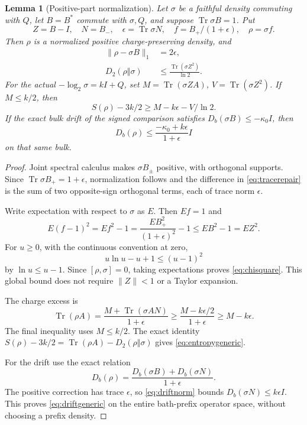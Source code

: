 \documentclass[11pt]{article}
\newtheorem{lemma}[theorem]{Lemma}
\newcommand{\Tr}{\operatorname{Tr}}
\newcommand{\norm}[1]{\lVert #1\rVert}
\begin{document}
\begin{lemma}[Positive-part normalization]\label{lem:repair}
Let \(\sigma\) be a faithful density commuting with \(Q\), let \(B=B^*\) commute with \(\sigma,Q\),
and suppose \(\Tr\sigma B=1\). Put
\[
 Z=B-I,\quad N=B_-,\quad \epsilon=\Tr\sigma N,\quad
 f=B_+/(1+\epsilon),\quad \rho=\sigma f.
\]
Then \(\rho\) is a normalized positive charge-preserving density,
and
\begin{align}
 \norm{\rho-\sigma B}_1&=2\epsilon,\label{eq:tracerepair}\\
 D_2(\rho\Vert\sigma)&\le\frac{\Tr(\sigma Z^2)}{\ln2}.\label{eq:chisquare}
\end{align}
For the actual \(-\log_2\sigma=kI+Q\), set
\(M=\Tr(\sigma ZA)\), \(V=\Tr(\sigma Z^2)\).
If \(M\le k/2\), then
\begin{equation}\label{eq:entropygeneric}
 S(\rho)-3k/2\ge M-k\epsilon-V/\ln2.
\end{equation}
If the exact bulk drift of the signed comparison satisfies
\(D_b(\sigma B)\le-\kappa_0 I\), then
\begin{equation}\label{eq:driftgeneric}
 D_b(\rho)\le
       \frac{-\kappa_0+k\epsilon}{1+\epsilon}I
\end{equation}
on that same bulk.
\end{lemma}
\begin{proof}
Joint spectral calculus makes \(\sigma B_\pm\) positive, with orthogonal
supports. Since \(\Tr\sigma B_+=1+\epsilon\), normalization follows and
the difference in \eqref{eq:tracerepair} is the sum of two opposite-sign
orthogonal terms, each of trace norm \(\epsilon\).

Write expectation with respect to \(\sigma\) as \(E\). Then \(Ef=1\) and
\[
 E(f-1)^2=Ef^2-1
   =\frac{EB_+^2}{(1+\epsilon)^2}-1
   \le EB^2-1=EZ^2.
\]
For \(u\ge0\), with the continuous convention at zero,
\[
 u\ln u-u+1\le(u-1)^2
\]
by \(\ln u\le u-1\). Since \([\rho,\sigma]=0\), taking expectations
proves \eqref{eq:chisquare}. This global bound does not require
\(\norm Z<1\) or a Taylor expansion.

The charge excess is
\[
 \Tr(\rho A)=\frac{M+\Tr(\sigma AN)}{1+\epsilon}
       \ge\frac{M-k\epsilon/2}{1+\epsilon}\ge M-k\epsilon.
\]
The final inequality uses \(M\le k/2\).
The exact identity
\(S(\rho)-3k/2=\Tr(\rho A)-D_2(\rho\Vert\sigma)\)
gives \eqref{eq:entropygeneric}.

For the drift use the exact relation
\[
 D_b(\rho)=\frac{D_b(\sigma B)+D_b(\sigma N)}{1+\epsilon}.
\]
The positive correction has trace \(\epsilon\), so
\eqref{eq:driftnorm} bounds \(D_b(\sigma N)\le k\epsilon I\).
This proves \eqref{eq:driftgeneric} on the entire bath-prefix operator
space, without choosing a prefix density.
\end{proof}
\end{document}
